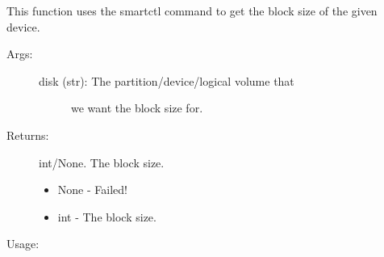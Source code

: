 \documentclass[letterpaper,10pt,english]{sphinxmanual}
\begin{document}
\begin{fulllineitems}
\label{\detokenize{cygwin:getdevinfo.cygwin.get_block_size}}

This function uses the smartctl command to get the block size
of the given device.
\begin{description}
\item[{Args:}] \leavevmode\begin{description}
\item[{disk (str):     The partition/device/logical volume that}] \leavevmode
we want the block size for.

\end{description}

\item[{Returns:}] \leavevmode
int/None. The block size.
\begin{itemize}
\item {} 
None - Failed!

\item {} 
int  - The block size.

\end{itemize}

\end{description}

Usage:

\begin{sphinxVerbatim}[commandchars=\\\{\}]
  
\end{sphinxVerbatim}

\end{fulllineitems}

\end{document}

